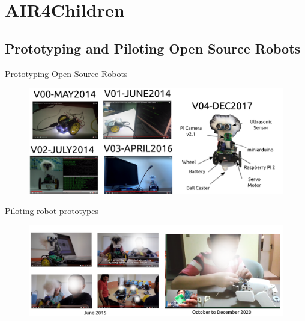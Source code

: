 \section{AIR4Children}

\subsection{Prototyping and Piloting Open Source Robots}

{
\begin{frame}{Prototyping Open Source Robots}
      \begin{figure}
        \centering
        \includegraphics[width=1.0\textwidth]{./figures/air4children/versions/drawing-v00.png}
      \end{figure}
\end{frame}
}

{
\begin{frame}{Piloting robot prototypes}
      \begin{figure}
        \centering
        \includegraphics[width=1.0\textwidth]{./figures/air4children/versions/drawing-v01.png}
      \end{figure}
\end{frame}
}

